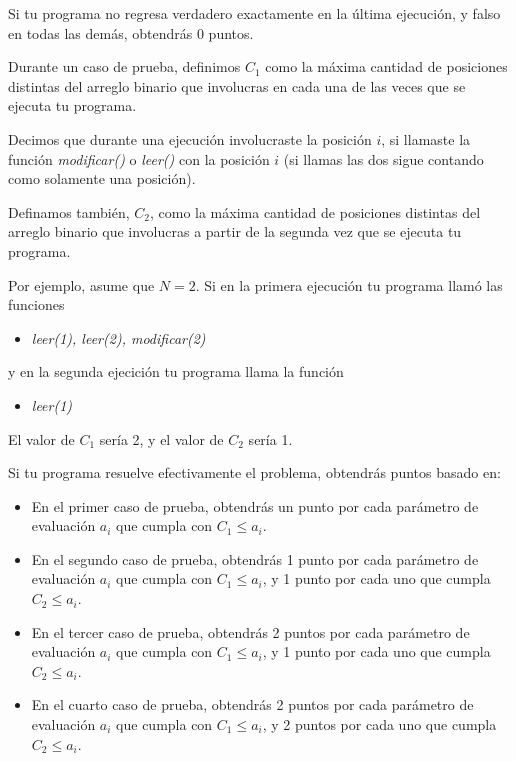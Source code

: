 \documentclass[12pt]{scrartcl}
\begin{document}
        Si tu programa no regresa verdadero exactamente en la última ejecución, y falso en todas las demás, obtendrás 0 puntos.

        Durante un caso de prueba, definimos $C_1$ como la máxima cantidad de posiciones distintas del arreglo binario que involucras en cada una de las veces que se ejecuta tu programa. 
        
        Decimos que durante una ejecución involucraste la posición $i$, si llamaste la función {\itshape modificar()} o {\itshape leer()} con la posición $i$ (si llamas las dos sigue contando como solamente una posición). 
        
        Definamos también, $C_2$, como la máxima cantidad de posiciones distintas del arreglo binario que involucras a partir de la segunda vez que se ejecuta tu programa.

        Por ejemplo, asume que $N = 2$. Si en la primera ejecución tu programa llamó las funciones 
        \begin{itemize}
            \item \textit{leer(1), leer(2), modificar(2)}
        \end{itemize}
        y en la segunda ejecición tu programa llama la función
        \begin{itemize}
            \item \textit{leer(1)}
        \end{itemize}
        El valor de $C_1$ sería 2, y el valor de $C_2$ sería 1. 
        
        
        Si tu programa resuelve efectivamente el problema, obtendrás puntos basado en:
        
        
        \begin{itemize}
            \item En el primer caso de prueba, obtendrás un punto por cada parámetro de evaluación $a_i$ que cumpla con $C_1 \le a_i$.
            \item En el segundo caso de prueba, obtendrás 1 punto por cada parámetro de evaluación $a_i$ que cumpla con $C_1 \le a_i$, y 1 punto por cada uno que cumpla $C_2 \le a_i$.
            \item En el tercer caso de prueba, obtendrás 2 puntos por cada parámetro de evaluación $a_i$ que cumpla con $C_1 \le a_i$, y 1 punto por cada uno que cumpla $C_2 \le a_i$.
            \item En el cuarto caso de prueba, obtendrás 2 puntos por cada parámetro de evaluación $a_i$ que cumpla con $C_1 \le a_i$, y 2 puntos por cada uno que cumpla $C_2 \le a_i$.
            
        \end{itemize}
\end{document}
